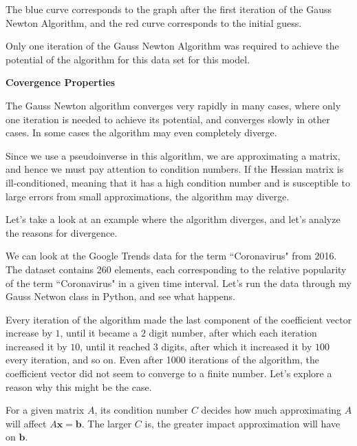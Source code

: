 \documentclass[12pt]{article}
\begin{document}
\vskip 0.2cm

The blue curve corresponds to the graph after the first iteration of the Gauss Newton Algorithm, and the red curve corresponds to the initial guess.

\vskip 0.2cm

Only one iteration of the Gauss Newton Algorithm was required to achieve the potential of the algorithm for this data set for this model.

\vskip 1cm

\begin{center}
\textbf{Covergence Properties}
\end{center}

The Gauss Newton algorithm converges very rapidly in many cases, where only one iteration is needed to achieve its potential, and converges slowly in other cases. In some cases the algorithm may even completely diverge.

\vskip 0.2cm

Since we use a pseudoinverse in this algorithm, we are approximating a matrix, and hence we must pay attention to condition numbers. If the Hessian matrix is ill-conditioned, meaning that it has a high condition number and is susceptible to large errors from small approximations, the algorithm may diverge. 

\vskip 0.2cm

Let's take a look at an example where the algorithm diverges, and let's analyze the reasons for divergence. 

\vskip 0.2cm

We can look at the Google Trends data for the term ``Coronavirus" from 2016. The dataset contains 260 elements, each corresponding to the relative popularity of the term ``Coronavirus" in a given time interval. Let's run the data through my Gauss Netwon class in Python, and see what happens.

\vskip 0.2cm

Every iteration of the algorithm made the last component of the coefficient vector increase by $1$, until it became a $2$ digit number, after which each iteration increased it by $10$, until it reached $3$ digits, after which it increased it by $100$ every iteration, and so on. Even after 1000 iterations of the algorithm, the coefficient vector did not seem to converge to a finite number. Let's explore a reason why this might be the case. 

\vskip 0.2cm

For a given matrix $A$, its condition number $C$ decides how much approximating $A$ will affect $A\mathbf{x} = \mathbf{b}$. The larger $C$ is, the greater impact approximation will have on $\mathbf{b}$. 
\end{document}

